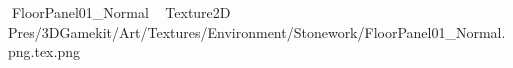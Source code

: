    FloorPanel01_Normal             	   Texture2D
   P   res/3DGamekit/Art/Textures/Environment/Stonework/FloorPanel01_Normal.png.tex.png